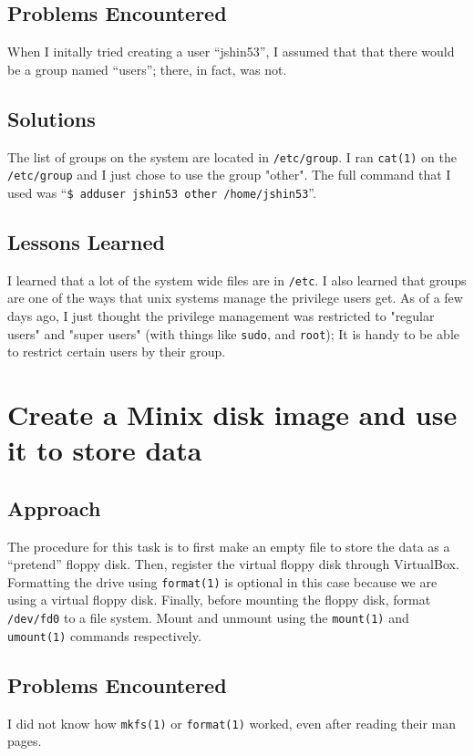 \documentclass[11pt]{article}
\begin{document}
\subsection{Problems Encountered}
When I initally tried creating a user ``jshin53'', I assumed that that there would be a group named ``users''; there, in fact, was not.

\subsection{Solutions}
The list of groups on the system are located in {\tt /etc/group}. I ran {\tt cat(1)} on the {\tt /etc/group} and I just chose to use the group "other". The full command that I used was ``{\tt \$ adduser jshin53 other /home/jshin53}''.

\subsection{Lessons Learned}
I learned that a lot of the system wide files are in {\tt /etc}. I also learned that groups are one of the ways that unix systems manage the privilege users get. As of a few days ago, I just thought the privilege management was restricted to "regular users" and "super users" (with things like {\tt sudo}, and {\tt root}); It is handy to be able to restrict certain users by their group.

\section{Create a {\sc Minix} disk image and use it to store data}
\subsection{Approach}
The procedure for this task is to first make an empty file to store the data as a ``pretend'' floppy disk. Then, register the virtual floppy disk through {\sc VirtualBox}. Formatting the drive using {\tt format(1)} is optional in this case because we are using a virtual floppy disk. Finally, before mounting the floppy disk, format {\tt /dev/fd0} to a file system. Mount and unmount using the {\tt mount(1)} and {\tt umount(1)} commands respectively.

\subsection{Problems Encountered}
I did not know how {\tt mkfs(1)} or {\tt format(1)} worked, even after reading their man pages.
\end{document}
